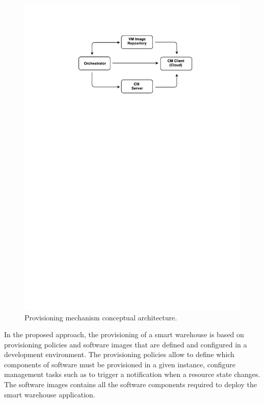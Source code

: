 \begin{figure}[ht!]
\centering
\includegraphics[width=.7\textwidth]{images/c4t-generic-solution.pdf}
\caption[Provisioning mechanism conceptual architecture.]{Provisioning mechanism conceptual architecture.}
\label{fig:provisioning_generic_architecture}
\end{figure}

In the proposed approach, the provisioning of a smart warehouse is based on provisioning policies and
software images that are defined and configured in a development environment. The provisioning policies
allow to define which components of software must be provisioned in a given instance, configure
management tasks such as to trigger a notification when a resource state changes. The software images
contains all the software components required to deploy the smart warehouse application.\\

